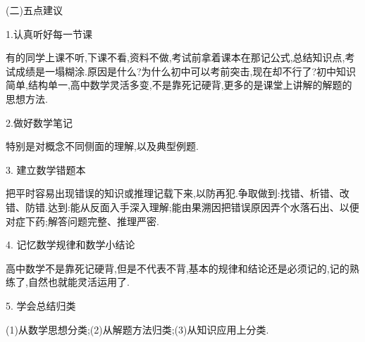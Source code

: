 (二)五点建议

1.认真听好每一节课

有的同学上课不听,下课不看,资料不做,考试前拿着课本在那记公式,总结知识点,考试成绩是一塌糊涂.原因是什么?为什么初中可以考前突击,现在却不行了?初中知识简单,结构单一,高中数学灵活多变,不是靠死记硬背,更多的是课堂上讲解的解题的思想方法.

2.做好数学笔记

特别是对概念不同侧面的理解,以及典型例题.

3. 建立数学错题本

把平时容易出现错误的知识或推理记载下来,以防再犯.争取做到:找错、析错、改错、防错.达到:能从反面入手深入理解;能由果溯因把错误原因弄个水落石出、以便对症下药;解答问题完整、推理严密.

4. 记忆数学规律和数学小结论

高中数学不是靠死记硬背,但是不代表不背,基本的规律和结论还是必须记的,记的熟练了,自然也就能灵活运用了.

5. 学会总结归类

(1)从数学思想分类;(2)从解题方法归类;(3)从知识应用上分类.

